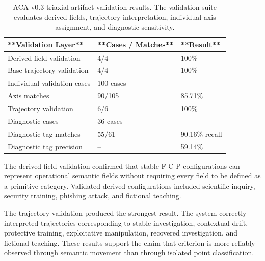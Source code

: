 \documentclass[11pt]{article}
\begin{document}
\begin{table}[h]

\centering

\begin{tabular}{lll}

\hline

**Validation Layer** & **Cases / Matches** & **Result** \\

\hline

Derived field validation & 4/4 & 100\% \\

Base trajectory validation & 4/4 & 100\% \\

Individual validation cases & 100 cases & -- \\

Axis matches & 90/105 & 85.71\% \\

Trajectory validation & 6/6 & 100\% \\

Diagnostic cases & 36 cases & -- \\

Diagnostic tag matches & 55/61 & 90.16\% recall \\

Diagnostic tag precision & -- & 59.14\% \\

\hline

\end{tabular}

\caption{ACA v0.3 triaxial artifact validation results. The validation suite evaluates derived fields, trajectory interpretation, individual axis assignment, and diagnostic sensitivity.}

\label{tab:triaxial-validation-results}

\end{table}

The derived field validation confirmed that stable F-C-P configurations can represent operational semantic fields without requiring every field to be defined as a primitive category. Validated derived configurations included scientific inquiry, security training, phishing attack, and fictional teaching.

The trajectory validation produced the strongest result. The system correctly interpreted trajectories corresponding to stable investigation, contextual drift, protective training, exploitative manipulation, recovered investigation, and fictional teaching. These results support the claim that criterion is more reliably observed through semantic movement than through isolated point classification.
\end{document}
